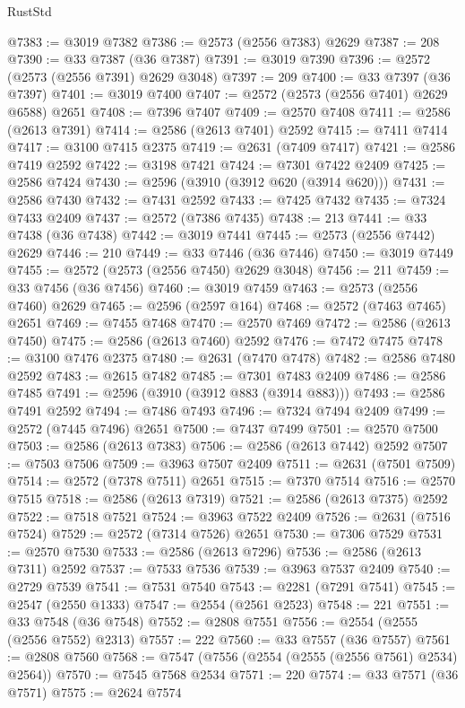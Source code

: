\begin{lexlean}{RustStd}
\begin{coremodule}
@7383 := @3019 @7382
@7386 := @2573 (@2556 @7383) @2629
@7387 := 208
@7390 := @33 @7387 (@36 @7387)
@7391 := @3019 @7390
@7396 := @2572 (@2573 (@2556 @7391) @2629 @3048)
@7397 := 209
@7400 := @33 @7397 (@36 @7397)
@7401 := @3019 @7400
@7407 := @2572 (@2573 (@2556 @7401) @2629 @6588) @2651
@7408 := @7396 @7407
@7409 := @2570 @7408
@7411 := @2586 (@2613 @7391)
@7414 := @2586 (@2613 @7401) @2592
@7415 := @7411 @7414
@7417 := @3100 @7415 @2375
@7419 := @2631 (@7409 @7417)
@7421 := @2586 @7419 @2592
@7422 := @3198 @7421
@7424 := @7301 @7422 @2409
@7425 := @2586 @7424
@7430 := @2596 (@3910 (@3912 @620 (@3914 @620)))
@7431 := @2586 @7430
@7432 := @7431 @2592
@7433 := @7425 @7432
@7435 := @7324 @7433 @2409
@7437 := @2572 (@7386 @7435)
@7438 := 213
@7441 := @33 @7438 (@36 @7438)
@7442 := @3019 @7441
@7445 := @2573 (@2556 @7442) @2629
@7446 := 210
@7449 := @33 @7446 (@36 @7446)
@7450 := @3019 @7449
@7455 := @2572 (@2573 (@2556 @7450) @2629 @3048)
@7456 := 211
@7459 := @33 @7456 (@36 @7456)
@7460 := @3019 @7459
@7463 := @2573 (@2556 @7460) @2629
@7465 := @2596 (@2597 @164)
@7468 := @2572 (@7463 @7465) @2651
@7469 := @7455 @7468
@7470 := @2570 @7469
@7472 := @2586 (@2613 @7450)
@7475 := @2586 (@2613 @7460) @2592
@7476 := @7472 @7475
@7478 := @3100 @7476 @2375
@7480 := @2631 (@7470 @7478)
@7482 := @2586 @7480 @2592
@7483 := @2615 @7482
@7485 := @7301 @7483 @2409
@7486 := @2586 @7485
@7491 := @2596 (@3910 (@3912 @883 (@3914 @883)))
@7493 := @2586 @7491 @2592
@7494 := @7486 @7493
@7496 := @7324 @7494 @2409
@7499 := @2572 (@7445 @7496) @2651
@7500 := @7437 @7499
@7501 := @2570 @7500
@7503 := @2586 (@2613 @7383)
@7506 := @2586 (@2613 @7442) @2592
@7507 := @7503 @7506
@7509 := @3963 @7507 @2409
@7511 := @2631 (@7501 @7509)
@7514 := @2572 (@7378 @7511) @2651
@7515 := @7370 @7514
@7516 := @2570 @7515
@7518 := @2586 (@2613 @7319)
@7521 := @2586 (@2613 @7375) @2592
@7522 := @7518 @7521
@7524 := @3963 @7522 @2409
@7526 := @2631 (@7516 @7524)
@7529 := @2572 (@7314 @7526) @2651
@7530 := @7306 @7529
@7531 := @2570 @7530
@7533 := @2586 (@2613 @7296)
@7536 := @2586 (@2613 @7311) @2592
@7537 := @7533 @7536
@7539 := @3963 @7537 @2409
@7540 := @2729 @7539
@7541 := @7531 @7540
@7543 := @2281 (@7291 @7541)
@7545 := @2547 (@2550 @1333)
@7547 := @2554 (@2561 @2523)
@7548 := 221
@7551 := @33 @7548 (@36 @7548)
@7552 := @2808 @7551
@7556 := @2554 (@2555 (@2556 @7552) @2313)
@7557 := 222
@7560 := @33 @7557 (@36 @7557)
@7561 := @2808 @7560
@7568 := @7547 (@7556 (@2554 (@2555 (@2556 @7561) @2534) @2564))
@7570 := @7545 @7568 @2534
@7571 := 220
@7574 := @33 @7571 (@36 @7571)
@7575 := @2624 @7574

\end{coremodule}
\end{lexlean}
